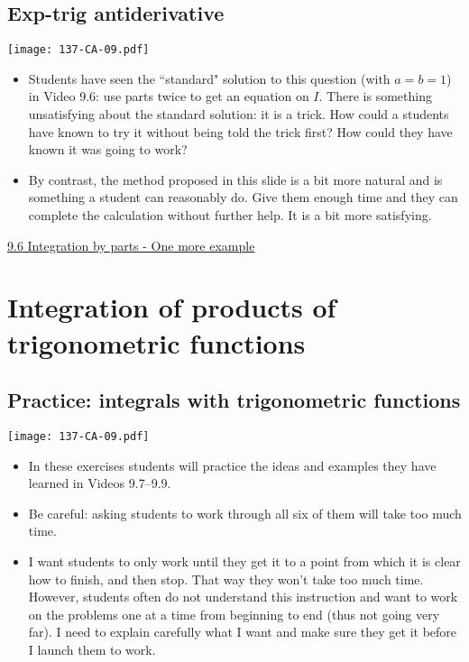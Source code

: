 \documentclass[11pt]{article}
\newcommand{\nl}{\hfill \vspace{-1.1\baselineskip}} %
\newcommand{\vvi}{\hspace{8mm} \href{https://www.youtube.com/watch?v=gR-chzRVpWo&list=PLlwePzQY_wW_DPAQSBjQmMs0hF8T7yVkF&index=6}{9.6 Integration by parts - One more example}}
\begin{document}
\newpage
\subsection{Exp-trig antiderivative}

\begin{center}
{ \texttt{[image: 137-CA-09.pdf]}} 
\end{center}

\begin{comments}
\nl
	\begin{itemize}
		\item Students have seen the ``standard" solution to this question (with $a=b=1$) in Video 9.6: use parts twice to get an equation on $I$.  There is something unsatisfying about the standard solution: it is a trick.  How could a students have known to try it without being told the trick first?  How could they have known it was going to work?
		
		\item By contrast, the method proposed in this slide is a bit more natural and is something a student can reasonably do.  Give them enough time and they can complete the calculation without further help.  It is a bit more satisfying.
	\end{itemize}
\end{comments}

\begin{videos}
\vvi
\end{videos}

\newpage
\section{Integration of products of trigonometric functions}
\subsection{Practice: integrals with trigonometric functions}

\begin{center}
{ \texttt{[image: 137-CA-09.pdf]}} 
\end{center}

\begin{comments}
\nl
	\begin{itemize}
		\item In these exercises students will practice the ideas and examples they have learned in Videos 9.7--9.9.  
		\item Be careful: asking students to work through all six of them will take too much time.
		\item I want students to only work until they get it to a point from which it is clear how to finish, and then stop.  That way they won't take too much time.  However, students often do not understand this instruction and want to work on the problems one at a time from beginning to end (thus not going very far).  I need to explain carefully what I want and make sure they get it before I launch them to work.
	\end{itemize}
\end{comments}
\end{document}

